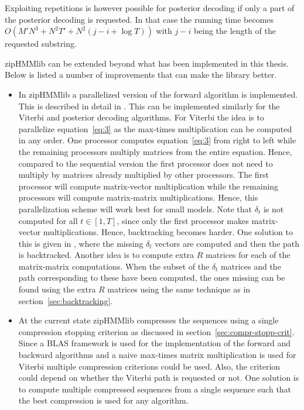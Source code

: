 Exploiting repetitions is however possible for posterior decoding if only a
part of the posterior decoding is requested. In that case the running time
becomes $O(M' N^3 + N^2 T' + N^2 (j - i + \log T))$ with $j - i$ being the
length of the requested substring.

zipHMMlib can be extended beyond what has been implemented in this thesis. Below
is listed a number of improvements that can make the library better.
\begin{itemize}
\item In zipHMMlib a parallelized version of the forward algorithm is implemented.
  This is described in detail in \citet{sand2014engineering}. This can be
  implemented similarly for the Viterbi and posterior decoding algorithms. For
  Viterbi the idea is to parallelize equation~\eqref{eq:3} as the max-times
  multiplication can be computed in any order. One processor computes
  equation~\eqref{eq:3} from right to left while the remaining processors
  multiply matrices from the entire equation. Hence, compared to the sequential
  version the first processor does not need to multiply by matrices already
  multiplied by other processors. The first processor will compute
  matrix-vector multiplication while the remaining processors will compute
  matrix-matrix multiplications. Hence, this parallelization scheme will work
  best for small models. Note that $\delta_t$ is not computed for all
  $t \in [1, T]$, since only the first processor makes matrix-vector
  multiplications. Hence, backtracking becomes harder. One solution to this is
  given in \citet{sand2014engineering}, where the missing $\delta_t$ vectors
  are computed and then the path is backtracked. Another idea is to compute
  extra $R$ matrices for each of the matrix-matrix computations. When the
  subset of the $\delta_t$ matrices and the path corresponding to these have
  been computed, the ones missing can be found using the extra $R$ matrices
  using the same technique as in section~\ref{sec:backtracking}.
\item At the current state zipHMMlib compresses the sequences using a single
  compression stopping criterion as discussed in
  section~\ref{sec:compr-stopp-crit}. Since a BLAS framework is used for the
  implementation of the forward and backward algorithms and a naive max-times
  matrix multiplication is used for Viterbi multiple compression criterions
  could be used. Also, the criterion could depend on whether the Viterbi path
  is requested or not. One solution is to compute multiple compressed sequences
  from a single sequence such that the best compression is used for any algorithm.

\end{itemize}
